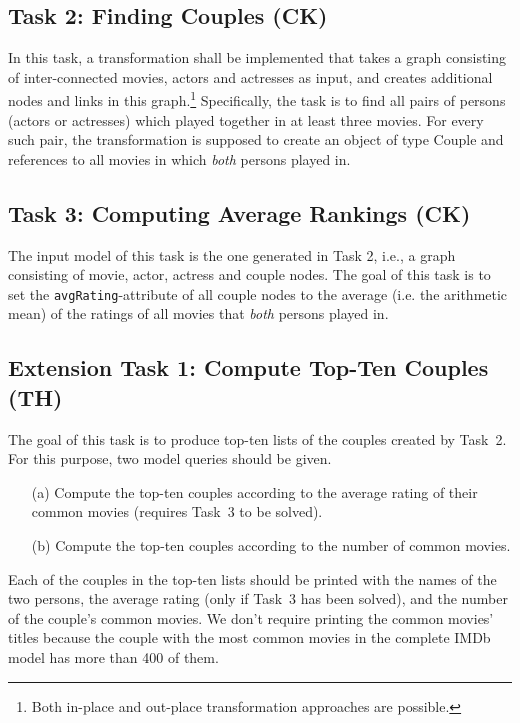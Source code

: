 \documentclass[a4paper,11pt]{article}
\begin{document}
\subsection{Task 2: Finding Couples (CK)}

In this task, a transformation shall be implemented that
takes a graph consisting of inter-connected movies, actors
and actresses as input, and creates additional nodes and 
links in this graph.\footnote{Both in-place and out-place 
transformation approaches are possible.} Specifically,
the task is to find all pairs of persons (actors or actresses)
which played together in at least three movies. For every
such pair, the transformation is supposed to create an
object of type \textsf{Couple} and references to all
movies in which \emph{both} persons played in.


\subsection{Task 3: Computing Average Rankings (CK)}

The input model of this task is the one generated in Task 2,
i.e., a graph consisting of movie, actor, actress and couple
nodes. The goal of this task is to set the \verb|avgRating|-attribute
of all couple nodes to the average (i.e. the
arithmetic mean) of the ratings of all movies that
\emph{both} persons played in.

\subsection{Extension Task 1: Compute Top-Ten Couples (TH)}

The goal of this task is to produce top-ten lists of the couples created by
Task~2.  For this purpose, two model queries should be given.

\begin{enumerate}
\item[(a)] Compute the top-ten couples according to the average rating of their
  common movies (requires Task~3 to be solved).
\item[(b)] Compute the top-ten couples according to the number of common
  movies.
\end{enumerate}

Each of the couples in the top-ten lists should be printed with the names of
the two persons, the average rating (only if Task~3 has been solved), and the
number of the couple's common movies.  We don't require printing the common
movies' titles because the couple with the most common movies in the complete
IMDb model has more than 400 of them.
\end{document}
